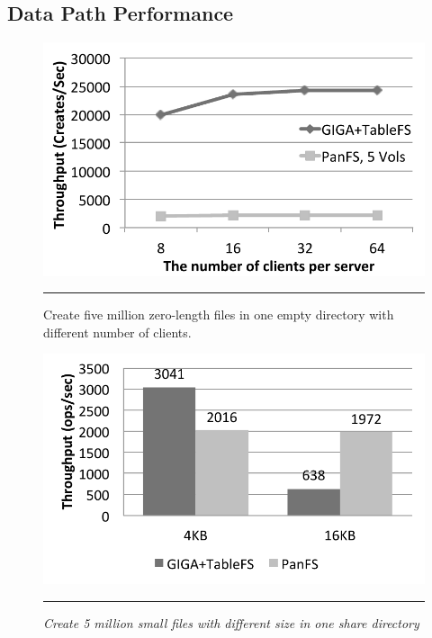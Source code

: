 \subsection{Data Path Performance}


\begin{figure}[t]  %
\centerline{\includegraphics[scale=0.5]{./figs/zero_file_creation_on_panfs}}
\vspace{10pt}
\caption{\normalsize
Create five million zero-length files in one empty directory
with different number of clients.
\textit{}
}
\vspace{10pt}
\hrule
\label{graph:ldb-singlenode}
\end{figure}       %

\begin{figure}[t]  %
\centerline{\includegraphics[scale=0.5]{./figs/small_file_creates}}
\vspace{10pt}
\caption{\normalsize
\textit{Create 5 million small files with different size
in one share directory}
}
\vspace{10pt}
\hrule
\label{graph:ldb-singlenode}
\end{figure}       %

